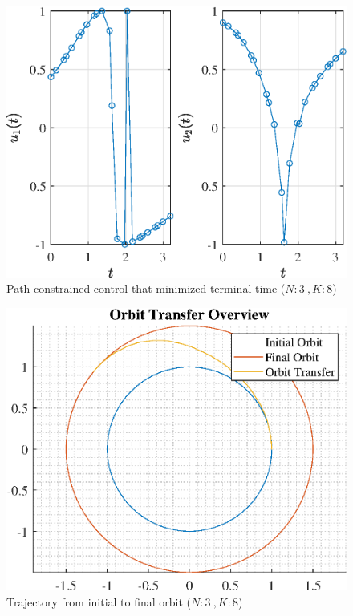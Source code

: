 \documentclass[]{article}
\begin{document}
\begin{figure}
	\centering
	\includegraphics[scale=0.75]{path_N3_K8_C3_tf.eps}
	\caption{Path constrained control that minimized terminal time (\(N:3\ , K:8\))}
	\label{fig:path_N3_K8_C3_tf}
\end{figure}
\begin{figure}
	\centering
	\includegraphics[scale=0.75]{orbit_N3_K8_C3_tf.eps}
	\caption{Trajectory from initial to final orbit (\(N:3\ , K:8\))}
	\label{fig:orbit_N3_K8_C3_tf}
\end{figure}
\end{document}
